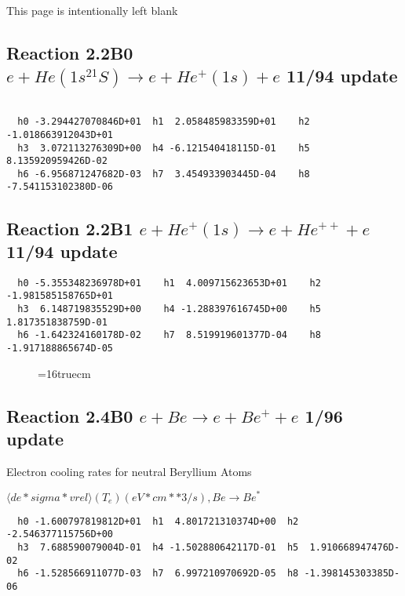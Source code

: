 \documentclass[12pt,dvipdfmx]{article}
\begin{document}
{\begin{small}
\begin{verbatim}
\end{verbatim}\end{small}
\newpage
This page is intentionally left blank
\newpage


\subsection{
Reaction 2.2B0 $e + He(1s^21S) \rightarrow e + He^+(1s) + e $ 11/94 update
}

\begin{small}\begin{verbatim}

  h0 -3.294427070846D+01  h1  2.058485983359D+01    h2 -1.018663912043D+01
  h3  3.072113276309D+00  h4 -6.121540418115D-01    h5  8.135920959426D-02
  h6 -6.956871247682D-03  h7  3.454933903445D-04    h8 -7.541153102380D-06
\end{verbatim}\end{small}

\subsection{
Reaction 2.2B1 $e + He^+(1s) \rightarrow e + He^{++} + e$ 11/94 update
}


\begin{small}\begin{verbatim}
  h0 -5.355348236978D+01    h1  4.009715623653D+01    h2 -1.981585158765D+01
  h3  6.148719835529D+00    h4 -1.288397616745D+00    h5  1.817351838759D-01
  h6 -1.642324160178D-02    h7  8.519919601377D-04    h8 -1.917188865674D-05
\end{verbatim}\end{small}

\begin{figure} \label{e2.2B}
\epsfxsize=16truecm
\end{figure}
\newpage

\subsection{
Reaction 2.4B0 $e + Be \rightarrow e + Be^+ + e $ 1/96 update
}

  Electron cooling rates for neutral
  Beryllium Atoms

 $ \langle de*sigma*vrel \rangle(T_e)  (eV*cm**3/s), Be  \rightarrow Be^*$

\begin{small}\begin{verbatim}
  h0 -1.600797819812D+01  h1  4.801721310374D+00  h2 -2.546377115756D+00
  h3  7.688590079004D-01  h4 -1.502880642117D-01  h5  1.910668947476D-02
  h6 -1.528566911077D-03  h7  6.997210970692D-05  h8 -1.398145303385D-06


\end{verbatim}
\end{small}}
\end{document}

